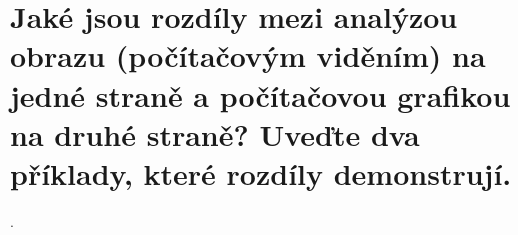 \section{Jaké jsou rozdíly mezi analýzou obrazu (počítačovým viděním) na jedné straně a počítačovou grafikou na 
druhé straně? Uveďte dva příklady, které rozdíly demonstrují.}.